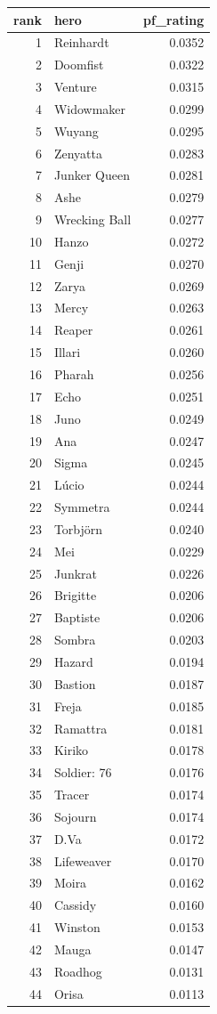 \begin{tabular}{rlr}
\toprule
rank & hero & pf_rating \\
\midrule
1 & Reinhardt & 0.0352 \\
2 & Doomfist & 0.0322 \\
3 & Venture & 0.0315 \\
4 & Widowmaker & 0.0299 \\
5 & Wuyang & 0.0295 \\
6 & Zenyatta & 0.0283 \\
7 & Junker Queen & 0.0281 \\
8 & Ashe & 0.0279 \\
9 & Wrecking Ball & 0.0277 \\
10 & Hanzo & 0.0272 \\
11 & Genji & 0.0270 \\
12 & Zarya & 0.0269 \\
13 & Mercy & 0.0263 \\
14 & Reaper & 0.0261 \\
15 & Illari & 0.0260 \\
16 & Pharah & 0.0256 \\
17 & Echo & 0.0251 \\
18 & Juno & 0.0249 \\
19 & Ana & 0.0247 \\
20 & Sigma & 0.0245 \\
21 & Lúcio & 0.0244 \\
22 & Symmetra & 0.0244 \\
23 & Torbjörn & 0.0240 \\
24 & Mei & 0.0229 \\
25 & Junkrat & 0.0226 \\
26 & Brigitte & 0.0206 \\
27 & Baptiste & 0.0206 \\
28 & Sombra & 0.0203 \\
29 & Hazard & 0.0194 \\
30 & Bastion & 0.0187 \\
31 & Freja & 0.0185 \\
32 & Ramattra & 0.0181 \\
33 & Kiriko & 0.0178 \\
34 & Soldier: 76 & 0.0176 \\
35 & Tracer & 0.0174 \\
36 & Sojourn & 0.0174 \\
37 & D.Va & 0.0172 \\
38 & Lifeweaver & 0.0170 \\
39 & Moira & 0.0162 \\
40 & Cassidy & 0.0160 \\
41 & Winston & 0.0153 \\
42 & Mauga & 0.0147 \\
43 & Roadhog & 0.0131 \\
44 & Orisa & 0.0113 \\
\bottomrule
\end{tabular}
